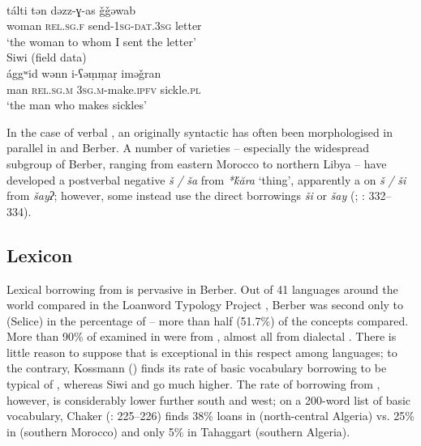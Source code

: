 \documentclass[output=paper]{langsci/langscibook}
\begin{document}
\ea
{}\\
\gll tálti tən dəzz-ɣ{}-as ǧǧəwab\\
woman \textsc{rel.sg.f} send-\textsc{1sg-dat.3sg} letter\\
\glt `the woman to whom I sent the letter' \\
\ex 
{ Siwi (field data)}\\
\gll ággʷid wənn i-ʕəṃṃaṛ iməǧran\\
man \textsc{rel.sg.m} \textsc{3sg.m}{}-make.\textsc{ipfv} sickle.\textsc{pl}\\
\glt `the man who makes sickles' 
\z

In the case of verbal , an originally syntactic  has often been morphologised in parallel in  and Berber. A number of varieties – especially the widespread  subgroup of Berber, ranging from eastern Morocco to northern Libya – have developed a postverbal negative  \textit{š} \textit{/} \textit{ša} from \textit{*\'{k}ăra} `thing', apparently a  on  \textit{š} \textit{/} \textit{ši} from \textit{šayʔ}; however, some instead use the direct borrowings \textit{ši} or \textit{šay} (\citealt{Lucas2007}; \citealt{Kossmann2013book}: 332–334).


 
 \subsection{Lexicon}


Lexical borrowing from  is pervasive in Berber. Out of 41 languages around the world compared in the Loanword Typology Project \citep{Tadmor2009},  Berber was second only to (Selice)  in the percentage of  – more than half (51.7\%) of the concepts compared. More than 90\% of  examined in  were from , almost all from dialectal  .  There is little reason to suppose that  is exceptional in this respect among  languages; to the contrary, Kossmann (\citeyear[110]{Kossmann2013book}) finds its rate of basic vocabulary borrowing to be typical of , whereas Siwi and  go much higher. The rate of borrowing from , however, is considerably lower further south and west; on a 200-word list of basic vocabulary, Chaker (\citeyear{Chaker1984}: 225–226) finds 38\%  loans in  (north-central Algeria) vs. 25\% in  (southern Morocco) and only 5\% in Tahaggart  (southern Algeria).
\end{document}
